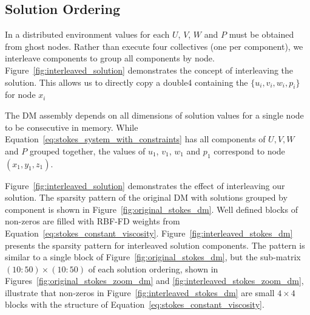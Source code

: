 \subsection{Solution Ordering}

In a distributed environment values for each $U$, $V$, $W$ and $P$ must be obtained from ghost nodes. Rather than execute four collectives (one per component), we interleave components to group all components by node. Figure~\ref{fig:interleaved_solution} demonstrates the concept of interleaving the solution. This allows us to directly copy a double4 containing the $\{u_i, v_i, w_i, p_i\}$ for node $x_i$

The DM assembly depends on all dimensions of solution values for a single node to be consecutive in memory. While Equation~\ref{eq:stokes_system_with_constraints} has all components of $U, V, W$ and $P$ grouped together, the values of $u_1$, $v_1$, $w_1$ and $p_1$ correspond to node $(x_1, y_1, z_1)$. 

Figure~\ref{fig:interleaved_solution} demonstrates the effect of interleaving our solution. The sparsity pattern of the original DM with solutions grouped by component is shown in Figure~\ref{fig:original_stokes_dm}. Well defined blocks of non-zeros are filled with RBF-FD weights from Equation~\ref{eq:stokes_constant_viscosity}. Figure~\ref{fig:interleaved_stokes_dm} presents the sparsity pattern for interleaved solution components. The pattern is similar to a single block of Figure~\ref{fig:original_stokes_dm}, but the sub-matrix $(10:50)\times(10:50)$ of each solution ordering, shown in Figures~\ref{fig:original_stokes_zoom_dm} and \ref{fig:interleaved_stokes_zoom_dm}, illustrate that non-zeros in Figure~\ref{fig:interleaved_stokes_dm} are small $4\times4$ blocks with the structure of Equation~\ref{eq:stokes_constant_viscosity}.

